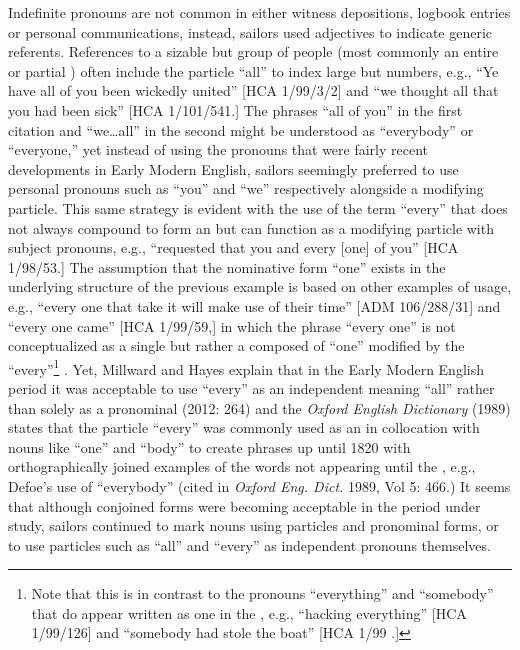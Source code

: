 Indefinite pronouns are not common in either witness depositions, logbook entries or personal communications, instead, sailors used adjectives to indicate generic referents. References to a sizable but  group of people (most commonly an entire or partial ) often include the particle “all” to index large but  numbers, e.g., “Ye have all of you been wickedly united” [HCA 1/99/3/2] and “we thought all that you had been sick” [HCA 1/101/541.] The phrases “all of you” in the first citation and “we…all” in the second might be understood as “everybody” or “everyone,” yet instead of using the  pronouns that were fairly recent developments in Early Modern English, sailors seemingly preferred to use personal pronouns such as “you” and “we” respectively alongside a modifying particle. This same strategy is evident with the use of the term “every” that does not always compound to form an   but can function as a modifying  particle with subject pronouns, e.g., “requested that you and every [one] of you” [HCA 1/98/53.] The assumption that the nominative form “one” exists in the underlying structure of the previous example is based on other examples of usage, e.g., “every one that take it will make use of their time” [ADM 106/288/31] and “every one came” [HCA 1/99/59,] in which the phrase “every one” is not conceptualized as a single  but rather a  composed of “one” modified by the  “every”\footnote{Note that this is in contrast to the  pronouns “everything” and “somebody” that do appear written as one  in the , e.g., “hacking everything” [HCA 1/99/126] and “somebody had stole the boat” [HCA 1/99  \citealt{Islands1722}.]} . Yet, Millward and Hayes explain that in the Early Modern English period it was acceptable to use “every” as an independent  meaning “all” rather than solely as a pronominal  (2012: 264) and the \textit{Oxford English Dictionary} (1989) states that the particle “every” was commonly used as an  in collocation with nouns like “one” and “body” to create   phrases up until 1820 with orthographically joined examples of the words not appearing until the , e.g.,  Defoe’s use of “everybody” (cited in \textit{Oxford Eng. Dict.} 1989, Vol 5: 466.) It seems that although conjoined forms were becoming acceptable in the period under study, sailors continued to mark  nouns using  particles and pronominal forms, or to use particles such as “all” and “every” as independent pronouns themselves.

